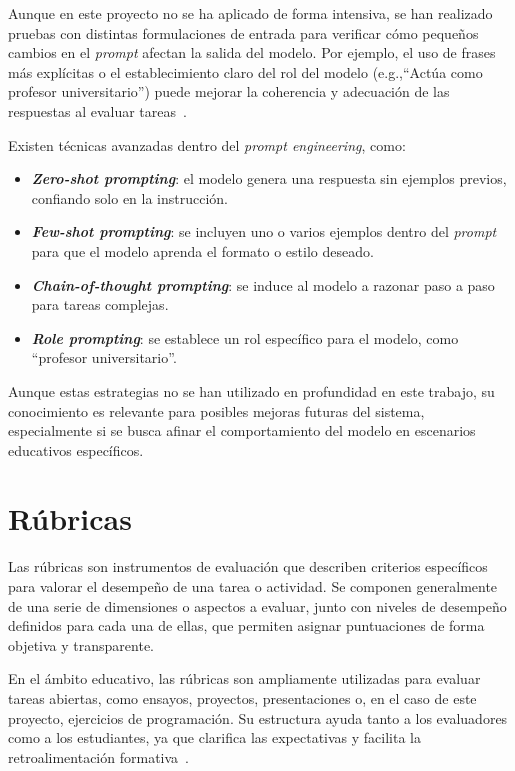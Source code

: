 Aunque en este proyecto no se ha aplicado de forma intensiva, se han realizado pruebas con distintas formulaciones de entrada para verificar cómo pequeños cambios en el \textit{prompt} afectan la salida del modelo. Por ejemplo, el uso de frases más explícitas o el establecimiento claro del rol del modelo (e.g.,``Actúa como profesor universitario'') puede mejorar la coherencia y adecuación de las respuestas al evaluar tareas~\cite{web:promptingguide}.

Existen técnicas avanzadas dentro del \textit{prompt engineering}, como:

\begin{itemize}
    \item \textbf{\textit{Zero-shot prompting}}: el modelo genera una respuesta sin ejemplos previos, 
	confiando solo en la instrucción.
    \item \textbf{\textit{Few-shot prompting}}: se incluyen uno o varios ejemplos dentro del \textit{prompt} para que el modelo aprenda el formato o estilo deseado.
    \item \textbf{\textit{Chain-of-thought prompting}}: se induce al modelo a razonar paso a paso para 
	tareas complejas.
    \item \textbf{\textit{Role prompting}}: se establece un rol específico para el modelo, como ``profesor universitario''.
\end{itemize}

Aunque estas estrategias no se han utilizado en profundidad en este trabajo, su conocimiento es relevante para posibles mejoras futuras del sistema, especialmente si se busca afinar el comportamiento del modelo en escenarios educativos específicos.

\section{Rúbricas}

Las rúbricas son instrumentos de evaluación que describen criterios específicos para valorar el desempeño de una tarea o actividad. Se componen generalmente de una serie de dimensiones o aspectos a evaluar, junto con niveles de desempeño definidos para cada una de ellas, que permiten asignar puntuaciones de forma objetiva y transparente.

En el ámbito educativo, las rúbricas son ampliamente utilizadas para evaluar tareas abiertas, como ensayos, proyectos, presentaciones o, en el caso de este proyecto, ejercicios de programación. Su estructura ayuda tanto a los evaluadores como a los estudiantes, ya que clarifica las expectativas y facilita la retroalimentación formativa~\cite{wiki:rubrica}.

